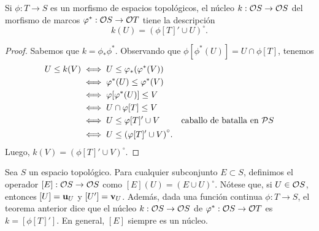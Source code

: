 \begin{thm}
  Si $\phi:T\to S$ es un morfismo de espacios topológicos,
  el núcleo $k:\cal OS\to\cal OS$ del morfismo de marcos
  $\phi^*:\cal OS\to\cal OT$ tiene la descripción
  \[
    k(U) = (\phi[T]' \cup U)^\circ
  .\]
\end{thm}
\begin{proof}
    Sabemos que $k=\phi_*\phi^*$.
    Observando que $\phi[\phi^*(U)]=U\cap\phi[T]$, tenemos
    \begin{align*}
        U\leq k(V)
        &\iff U \leq \phi_*(\phi^*(V)) \\
        &\iff \phi^*(U)\leq\phi^*(V) \\
        &\iff \phi[\phi^*(U)] \leq V \\
        &\iff U\cap \phi[T] \leq V \\
        &\iff U\leq \phi[T]'\cup V
            &\text{caballo de batalla en $\cal PS$} \\
        &\iff U\leq {(\phi[T]'\cup V)}^\circ.
    \end{align*}
    Luego, $k(V)={(\phi[T]'\cup V)}^\circ$.
\end{proof}

Sea $S$ un espacio topológico. Para cualquier subconjunto
$E\subset S$, definimos el operador $[E]:\cal O S\to \cal O S$
como $[E](U)={(E\cup U)}^{\circ}$.
Nótese que, si $U \in \cal OS$, entonces $[U]=\unuc U$
y $[U']=\vnuc U$.
Además, dada una función continua $\phi:T\to S$,
el teorema anterior dice que el núcleo
$k:\cal OS\to\cal OS$ de $\phi^*:\cal OS\to\cal OT$ es
$k=[\phi[T]']$. En general, $[E]$ siempre es un núcleo.

